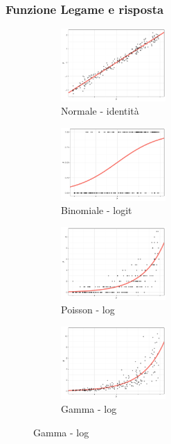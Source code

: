 \documentclass[pdf, aspectratio=169, xcolor=dvipsnames]{beamer}\usepackage[]{graphicx}\usepackage[]{color}
\theoremstyle{definition}
\begin{document}
\begin{frame}
\frametitle{Funzione Legame e risposta}

\fontsize{9pt}{11pt}\selectfont

\begin{figure}
  \centering
  \begin{subfigure}[b]{4.8cm}
    \centering
    \caption{Normale - identità}
    \includegraphics[width=4cm]{_bookdown_files/_main_files/figure-latex/resp-var-1.pdf}
  \end{subfigure}
  \qquad
  \begin{subfigure}[b]{4.8cm}
    \centering
    \caption{Binomiale - logit}
    \includegraphics[width=4cm]{_bookdown_files/_main_files/figure-latex/resp-var-2.pdf}
  \end{subfigure}
  \par\medskip
  \begin{subfigure}[b]{4.8cm}
    \centering
    \caption{Poisson - log}
    \includegraphics[width=4cm]{_bookdown_files/_main_files/figure-latex/resp-var-3.pdf}
  \end{subfigure}
  \qquad
  \begin{subfigure}[b]{4.8cm}
    \centering
    \caption{Gamma - log}
    \includegraphics[width=4cm]{_bookdown_files/_main_files/figure-latex/resp-var-4.pdf}
  \end{subfigure}
\end{figure}

\end{frame}
\end{document}

